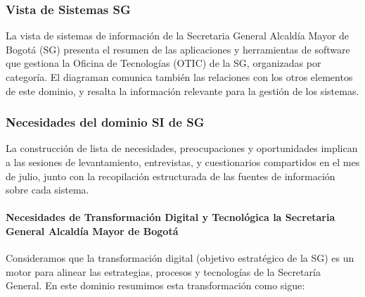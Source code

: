 \documentclass[
	a4paper, %
	12pt, %
]{include/CSSullivanBusinessReport}
\begin{document}
\subsubsection{Vista de Sistemas SG}\label{sec:vista-de-sistemas-sg}

La vista de sistemas de información de la Secretaria General Alcaldía
Mayor de Bogotá (SG) presenta el resumen de las aplicaciones y
herramientas de software que gestiona la Oficina de Tecnologías (OTIC)
de la SG, organizadas por categoría. El diagraman comunica también las
relaciones con los otros elementos de este dominio, y resalta la
información relevante para la gestión de los sistemas.

\subsubsection{Necesidades del dominio SI de
SG}\label{sec:necesidades-del-dominio-si-de-sg}

La construcción de lista de necesidades, preocupaciones y oportunidades
implican a las sesiones de levantamiento, entrevistas, y cuestionarios
compartidos en el mes de julio, junto con la recopilación estructurada
de las fuentes de información sobre cada sistema.

\paragraph{Necesidades de Transformación Digital y Tecnológica la
Secretaria General Alcaldía Mayor de
Bogotá}\label{sec:necesidades-de-transformaciuxf3n-digital-y-tecnoluxf3gica-la-secretaria-general-alcalduxeda-mayor-de-bogotuxe1}

Consideramos que la transformación digital (objetivo estratégico de la
SG) es un motor para alinear las estrategias, procesos y tecnologías de
la Secretaría General. En este dominio resumimos esta transformación
como sigue:
\end{document}
